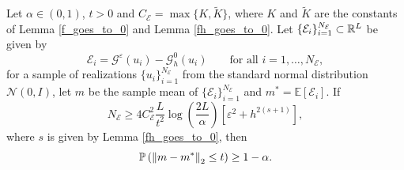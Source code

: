 \documentclass[10pt]{article}
\begin{document}
\begin{proposition}
\label{inequality_modelling_error}
Let $\alpha \in (0,1)$, $t > 0$ and $C_{\mathcal{E}} = \max \{ K, \tilde{K} \}$, where $K$ and $\tilde{K}$ are the constants of Lemma \ref{f_goes_to_0} and Lemma \ref{fh_goes_to_0}. Let $\{ \mathcal{E}_i \}_{i=1}^{N_{\mathcal{E}}} \subset \mathbb{R}^L$ be given by
\[ \mathcal{E}_i = \mathcal{G}^{\varepsilon}(u_i) - \mathcal{G}^0_h(u_i) \qquad \text{for all } i = 1, \dots, N_{\mathcal{E}}, \]
for a sample of realizations $\{ u_i \}_{i=1}^{N_{\mathcal{E}}}$ from the standard normal distribution $\mathcal{N}(0,I)$, let $m$ be the sample mean of $\{\mathcal E_i\}_{i=1}^{N_{\mathcal E}}$ and $m^* = \mathbb{E}[\mathcal{E}_i]$. If
\[ N_{\mathcal{E}} \ge 4 C_{\mathcal{E}}^2 \frac{L}{t^2} \log \left ( \frac{2L}{\alpha} \right ) \left [ \varepsilon^2 + h^{2(s+1)} \right ], \]
where $s$ is given by Lemma \ref{fh_goes_to_0}, then
\[ \mathbb{P} \left ( \left\|m - m^*\right\|_2 \le t \right ) \ge 1 - \alpha. \]
\end{proposition}
\end{document}
